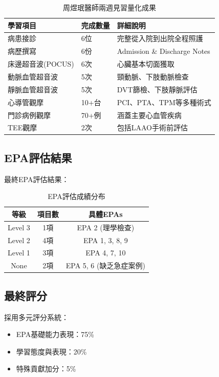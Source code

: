 \documentclass[12pt,a4paper]{article}
\begin{document}
\begin{table}[h]
\centering
\caption{周煜珉醫師兩週見習量化成果}
\begin{tabular}{|p{4cm}|p{2cm}|p{6cm}|}
\hline
\textbf{學習項目} & \textbf{完成數量} & \textbf{詳細說明} \\
\hline
病患接診 & 6位 & 完整從入院到出院全程照護 \\
\hline
病歷撰寫 & 6份 & Admission \& Discharge Notes \\
\hline
床邊超音波(POCUS) & 6次 & 心臟基本切面獲取 \\
\hline
動脈血管超音波 & 5次 & 頸動脈、下肢動脈檢查 \\
\hline
靜脈血管超音波 & 5次 & DVT篩檢、下肢靜脈評估 \\
\hline
心導管觀摩 & 10+台 & PCI、PTA、TPM等多種術式 \\
\hline
門診病例觀摩 & 70+例 & 涵蓋主要心血管疾病 \\
\hline
TEE觀摩 & 2次 & 包括LAAO手術前評估 \\
\hline
\end{tabular}
\end{table}

\subsection{EPA評估結果}

最終EPA評估結果：

\begin{table}[h]
\centering
\caption{EPA評估成績分布}
\begin{tabular}{|c|c|c|}
\hline
\textbf{等級} & \textbf{項目數} & \textbf{具體EPAs} \\
\hline
Level 3 & 1項 & EPA 2 (理學檢查) \\
\hline
Level 2 & 4項 & EPA 1, 3, 8, 9 \\
\hline
Level 1 & 3項 & EPA 4, 7, 10 \\
\hline
None & 2項 & EPA 5, 6 (缺乏急症案例) \\
\hline
\end{tabular}
\end{table}

\subsection{最終評分}

採用多元評分系統：
\begin{itemize}
\item EPA基礎能力表現：75\%
\item 學習態度與表現：20\%
\item 特殊貢獻加分：5\%
\end{itemize}
\end{document}
